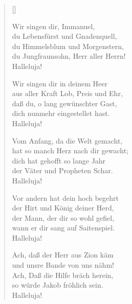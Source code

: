 
\begin{multicols}{2}
\settowidth{\versewidth}{Hast du doch selbst dich schwach gemacht,}                                                  
\begin{verse}[\versewidth]
  
   Wir singen dir, Immanuel,\\
  du Lebensfürst und Gnadenquell,\\
  du Himmelsblum und Morgenstern,\\
  du Jungfraunsohn, Herr aller Herrn!\\
  Halleluja!

   Wir singen dir in deinem Heer\\
  aus aller Kraft Lob, Preis und Ehr,\\
  daß du, o lang gewünschter Gast,\\
  dich nunmehr eingestellet hast.\\
  Halleluja!

   Vom Anfang, da die Welt gemacht,\\
  hat so manch Herz nach dir gewacht;\\
  dich hat gehofft so lange Jahr\\
  der Väter und Propheten Schar.\\
  Halleluja!

   Vor andern hat dein hoch begehrt\\
  der Hirt und König deiner Herd,\\
  der Mann, der dir so wohl gefiel,\\
  wann er dir sang auf Saitenspiel.\\
  Halleluja!

   Ach, daß der Herr aus Zion käm\\
  und unsre Bande von uns nähm!\\
  Ach, Daß die Hilfe bräch herein,\\
  so würde Jakob fröhlich sein.\\
  Halleluja!


\end{verse}
\end{multicols}
